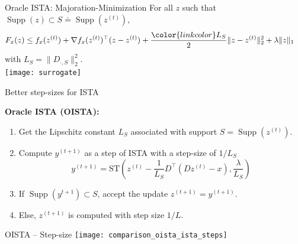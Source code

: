\documentclass{beamer}
\DeclareMathOperator*{\supp}{Supp}
\begin{document}
\begin{frame}[t]{Oracle ISTA: Majoration-Minimization}
    For all $z$ such that $\supp(z) \subset S \doteq \supp(z^{(t)})$,
    \begin{align*}
    F_x(z) & \le f_x(z^{(t)}) + \nabla f_x(z^{(t)})^\top(z - z^{(t)})
           + \frac{\color{linkcolor} L_S}{2}\|z - z^{(t)}\|_2^2 + \lambda\|z\|_1
    \end{align*}
    with $L_S = \|D_{\cdot,S}\|_2^2$.\\[1em]

\centering
\texttt{[image: surrogate]}\\

\end{frame}

\begin{frame}{Better step-sizes for ISTA}

    {\bf \large Oracle ISTA (OISTA):\\[1em]}
    \begin{enumerate}\itemsep1em
        \item Get the Lipschitz constant $L_S$ associated with support $S = \supp(z^{(t)})$.
        \item Compute $y^{(t+1)}$ as a step of ISTA with a step-size of $1/L_S$
        \[
        y^{(t+1)} = \text{ST}\left(z^{(t)}
        - \frac{1}{L_S}D^\top(D z^{(t)} - x),
        \frac{\lambda}{L_S}\right)
        \]
        \item If $\supp(y^{t+1}) \subset S$, accept the update $z^{(t+1)} = y^{(t+1)}$.
        \item Else, $z^{(t+1)}$ is computed with step size $1/L$.
    \end{enumerate}
\end{frame}


\begin{frame}{OISTA -- Step-size}
    \centering
    \texttt{[image: comparison\_oista\_ista\_steps]}\\
\end{frame}


\end{document}
